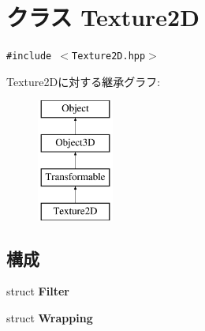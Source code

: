 \hypertarget{classm3g_1_1Texture2D}{
\section{クラス Texture2D}
\label{classm3g_1_1Texture2D}
}
{\tt \#include $<$Texture2D.hpp$>$}

Texture2Dに対する継承グラフ:\begin{figure}[H]
\begin{center}
\leavevmode
\includegraphics[height=4cm]{classm3g_1_1Texture2D}
\end{center}
\end{figure}
\subsection*{構成}
\begin{CompactItemize}
\item 
struct \textbf{Filter}
\item 
struct \textbf{Wrapping}
\end{CompactItemize}
